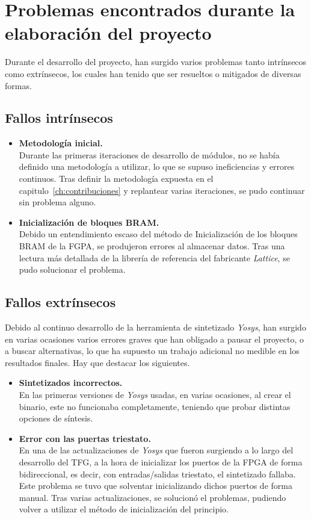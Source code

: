 \section{Problemas encontrados durante la elaboración del proyecto}
Durante el desarrollo del proyecto, han surgido varios problemas tanto intrínsecos como extrínsecos, los cuales han tenido que ser resueltos o mitigados de diversas formas. 

\subsection{Fallos intrínsecos}
\begin{itemize}
    \item \textbf{Metodología inicial.} \\
    Durante las primeras iteraciones de desarrollo de módulos, no se había definido una metodología a utilizar, lo que se supuso ineficiencias y errores continuos. Tras definir la metodología expuesta en el capitulo~\ref{ch:contribuciones} y replantear varias iteraciones, se pudo continuar sin problema alguno.
    
    \item \textbf{Inicialización de bloques BRAM.} \\
    Debido un entendimiento escaso del método de Inicialización de los bloques BRAM de la FGPA, se produjeron errores al almacenar datos. Tras una lectura más detallada de la librería de referencia\cite{lattice:ice-library} del fabricante \emph{Lattice}, se pudo solucionar el problema.
\end{itemize}

\subsection{Fallos extrínsecos}
Debido al continuo desarrollo de la herramienta de sintetizado \emph{Yosys}, han surgido en varias ocasiones varios errores graves que han obligado a pausar el proyecto, o a buscar alternativas, lo que ha supuesto un trabajo adicional no medible en los resultados finales. Hay que destacar los siguientes.
\begin{itemize}
    \item \textbf{Sintetizados incorrectos.} \\
    En las primeras versiones de \emph{Yosys} usadas, en varias ocasiones, al crear el binario, este no funcionaba completamente, teniendo que probar distintas opciones de síntesis.

    \item \textbf{Error con las puertas triestato.} \\
    En una de las actualizaciones de \emph{Yosys} que fueron surgiendo a lo largo del desarrollo del TFG, a la hora de inicializar los puertos de la FPGA de forma bidireccional, es decir, con entradas/salidas triestato, el sintetizado fallaba. Este problema se tuvo que solventar inicializando dichos puertos de forma manual. Tras varias actualizaciones, se solucionó el problemas, pudiendo volver a utilizar el método de inicialización del principio.
\end{itemize}


